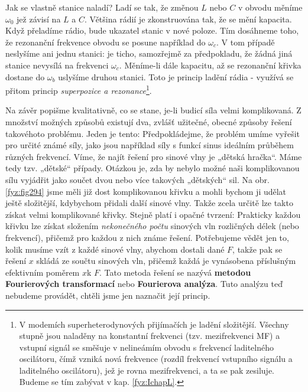     Jak se vlastně stanice naladí? Ladí se tak, že změnou \(L\) nebo \(C\) v obvodu měníme 
    \(\omega_0\) jež závisí na \(L\) a \(C\). Většina rádií je zkonstruována tak, že se mění 
    kapacita. Když přeladíme rádio, bude ukazatel stanic v nové poloze. Tím dosáhneme toho, že 
    rezonanční frekvence obvodu se posune například do \(\omega_c\). V tom případě neslyšíme ani 
    jednu stanici: je ticho, samozřejmě za předpokladu, že žádná jiná stanice nevysílá na frekvenci 
    \(\omega_c\). Měníme-li dále kapacitu, až se rezonanční křivka dostane do \(\omega_b\) uslyšíme 
    druhou stanici. Toto je princip ladění rádia - využívá se přitom princip \emph{superpozice a 
    rezonance}\footnote{V modemích superheterodynových přijímačích je ladění složitější. Všechny 
    stupně jsou naladěny na konstantní frekvenci (tzv. mezifrekvenci MF) a vstupní signál se 
    směšuje v nelineámím obvodu s frekvencí laditelného oscilátoru, čímž vzniká nová frekvence 
    (rozdíl frekvencí vstupního signálu a laditelného oscilátoru), jež je rovna mezifrekvenci, a ta 
    se pak zesiluje. Budeme se tím zabývat v kap. \ref{fyz:IchapL}.}.
    
    Na závěr popišme kvalitativně, co se stane, je-li budicí síla velmi komplikovaná. Z množství 
    možných způsobů existují dva, zvlášť užitečné, obecné způsoby řešení takovéhoto problému. Jeden 
    je tento: Předpokládejme, že problém umíme vyřešit pro určité známé síly, jako jsou například 
    síly s funkcí sinus ideálním průběhem různých frekvencí. Víme, že najít řešení pro sinové vlny 
    je „dětská hračka“. Máme tedy tzv. „dětské“ případy. Otázkou je, zda by nebylo možné naši 
    komplikovanou sílu vyjádřit jako součet dvou nebo více takových „dětských“ sil. Na obr. 
    \ref{fyz:fig294} jsme měli již dost komplikovanou křivku a mohli bychom ji udělat ještě 
    složitější, kdybychom přidali další sinové vlny. Takže zcela určitě lze takto získat velmi 
    komplikované křivky. Stejně platí i opačné tvrzení: Prakticky každou křivku lze získat složením 
    \emph{nekonečného počtu} sinových vln rozličných délek (nebo frekvencí), přičemž pro každou z 
    nich známe řešení. Potřebujeme vědět jen to, kolik musíme vzít z každé sinové vlny, abychom 
    dostali dané \(F\), takže pak se řešení \(x\) skládá ze součtu sinových vln, přičemž každá je 
    vynásobena příslušným efektivním poměrem \(x\)k  \(F\). Tato metoda řešení se nazývá 
    \textbf{metodou Fourierových transformací} nebo \textbf{Fourierova analýza}. Tuto analýzu teď 
    nebudeme provádět, chtěli jsme jen naznačit její princip.
    
